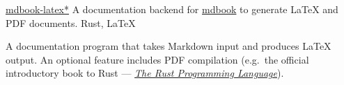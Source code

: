 \showoff
{\textcolor{my-blue}{\href{https://liambeckman.com/mdbook-latex}{mdbook-latex\textcolor{my-red}{*}}}}
{A documentation backend for \textcolor{my-blue}{\href{https://github.com/rust-lang/mdBook}{mdbook}} to generate \LaTeX{} and PDF documents.}
{Rust, \LaTeX{}}
{}

A documentation program that takes Markdown input and produces \LaTeX{} output. An optional feature includes PDF compilation (e.g.\ the official introductory book to Rust --- \textcolor{my-blue}{\href{https://github.com/lbeckman314/mdbook-latex/releases/latest/download/The.Rust.Programming.Language.pdf}{\emph{The Rust Programming Language}}}).

